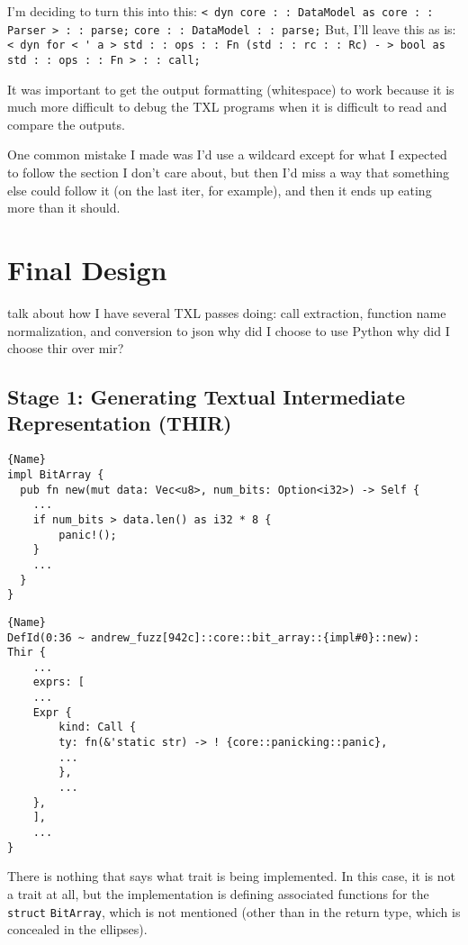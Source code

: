 \documentclass[11pt]{article}
\begin{document}
I'm deciding to turn this into this:
\lstinline{< dyn core : : DataModel as core : : Parser > : : parse;}
\lstinline{core : : DataModel : : parse;}
But, I'll leave this as is:
\lstinline{< dyn for < ' a > std : : ops : : Fn (std : : rc : : Rc) - > bool as std : : ops : : Fn > : : call;}

It was important to get the output formatting (whitespace) to work because it is much more difficult to debug the TXL programs when it is difficult to read and compare the outputs.


One common mistake I made was I'd use a wildcard except for what I expected to follow the section I don't care about, but then I'd miss a way that something else could follow it (on the last iter, for example), and then it ends up eating more than it should.

\section{Final Design} %
talk about how I have several TXL passes doing: call extraction, function name normalization, and conversion to json
why did I choose to use Python
why did I choose thir over mir?

\subsection{Stage 1: Generating Textual Intermediate Representation (THIR)}



\begin{lstlisting}[caption=Rust Code, label=code:rust_code]{Name}
impl BitArray {
  pub fn new(mut data: Vec<u8>, num_bits: Option<i32>) -> Self {
    ...
    if num_bits > data.len() as i32 * 8 {
        panic!();
    }
    ...
  }
}
\end{lstlisting}

\begin{lstlisting}[caption=THIR-flat, label=code:thir]{Name}
DefId(0:36 ~ andrew_fuzz[942c]::core::bit_array::{impl#0}::new):
Thir {
    ...
    exprs: [
    ...
    Expr {
        kind: Call {
        ty: fn(&'static str) -> ! {core::panicking::panic},
        ...
        },
        ...
    },
    ],
    ...
}
\end{lstlisting}

There is nothing that says what trait is being implemented.
In this case, it is not a trait at all, but the implementation is defining associated functions for the \lstinline{struct} \lstinline{BitArray}, which is not mentioned (other than in the return type, which is concealed in the ellipses).
\end{document}
